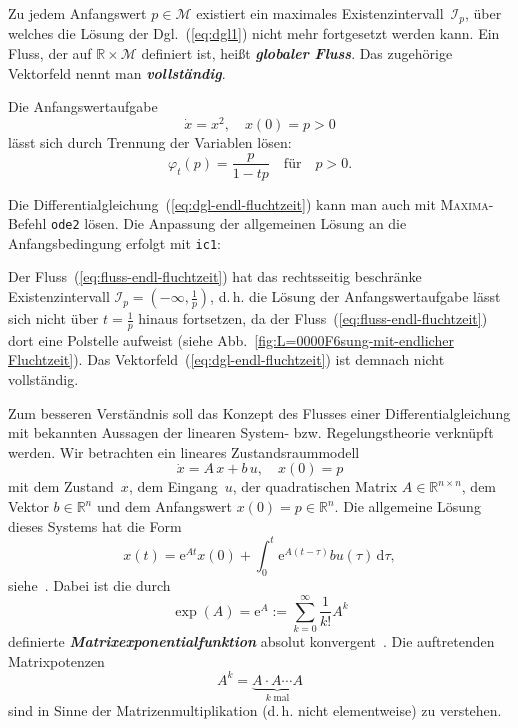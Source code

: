 Zu jedem Anfangswert $p\in\mathcal{M}$ existiert ein maximales Existenzintervall~$\mathcal{I}_{p}$,
über welches die Lösung der Dgl.~(\ref{eq:dgl1}) nicht mehr fortgesetzt
werden kann. Ein Fluss, der auf ${\mathbb{R}}\times\mathcal{M}$ definiert ist,
heißt \textbf{\em globaler Fluss}. Das zugehörige
Vektorfeld nennt man \textbf{\em vollständig}.
\begin{example}
\label{exa:EndlicheFluchtzeit}Die Anfangswertaufgabe
\begin{equation}
\dot{x}=x^{2},\quad x(0)=p>0\label{eq:dgl-endl-fluchtzeit}
\end{equation}
 lässt sich durch Trennung der Variablen lösen:
\begin{equation}
\varphi_{t}(p)=\frac{p}{1-tp}\quad\textrm{für}\quad p>0.\label{eq:fluss-endl-fluchtzeit}
\end{equation}

Die Differentialgleichung~(\ref{eq:dgl-endl-fluchtzeit}) kann man
auch mit \textsc{Maxima}-Befehl \texttt{ode2} lösen. Die Anpassung
der allgemeinen Lösung an die Anfangsbedingung erfolgt mit \texttt{ic1}:



Der Fluss~(\ref{eq:fluss-endl-fluchtzeit}) hat das rechtsseitig
beschränke Existenzintervall $\mathcal{I}_{p}=(-\infty,\tfrac{1}{p})$,
d.\,h. die Lösung der Anfangswertaufgabe lässt sich nicht über $t=\tfrac{1}{p}$
hinaus fortsetzen, da der Fluss~(\ref{eq:fluss-endl-fluchtzeit})
dort eine Polstelle aufweist (siehe Abb.~\ref{fig:L=0000F6sung-mit-endlicher Fluchtzeit}).
Das Vektorfeld~(\ref{eq:dgl-endl-fluchtzeit}) ist demnach nicht
vollständig.
\end{example}


Zum besseren Verständnis soll das Konzept des Flusses einer Differentialgleichung
mit bekannten Aussagen der linearen System- bzw. Regelungstheorie
verknüpft werden. Wir betrachten ein lineares Zustandsraummodell
\begin{equation}
\dot{x}=A\,x+b\,u,\quad x(0)=p\label{eq:diff-geo-lineares-zustandsraummodell}
\end{equation}
mit dem Zustand~$x$, dem Eingang~$u$, der quadratischen Matrix
$A\in{\mathbb{R}}^{n\times n}$, dem Vektor $b\in{\mathbb{R}}^{n}$ und dem Anfangswert
$x(0)=p\in{\mathbb{R}}^{n}$. Die allgemeine Lösung dieses Systems hat die Form
\begin{equation}
x(t)={\mathrm{e}}^{At}x(0)+\int_{0}^{t}{\mathrm{e}}^{A(t-\tau)}bu(\tau)\,{\mathrm{d}}\tau,\label{eq:diff-geo-loesing-linearer-zustandsmodell}
\end{equation}
siehe~\cite{lunze2007,reinschke2014buch}. Dabei ist die durch
\begin{equation}
\exp(A)={\mathrm{e}}^{A}:=\sum_{k=0}^{\infty}\frac{1}{k!}A^{k}\label{eq:matrix-exponential-funktion}
\end{equation}
definierte \textbf{\em Matrixexponentialfunktion}
absolut konvergent~\cite{moler79,arnold2001,gruene2009,kuehnel2011}.
Die auftretenden Matrixpotenzen
\[
A^{k}=\underbrace{A\cdot A\cdots A}_{k\;\text{mal}}
\]
sind in Sinne der Matrizenmultiplikation (d.\,h. nicht elementweise)
zu verstehen.

